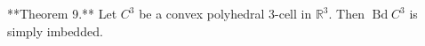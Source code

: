 **Theorem 9.** Let $C^3$ be a convex polyhedral 3-cell in $\mathbb{R}^3$. Then $\operatorname{Bd} C^3$ is simply imbedded.
